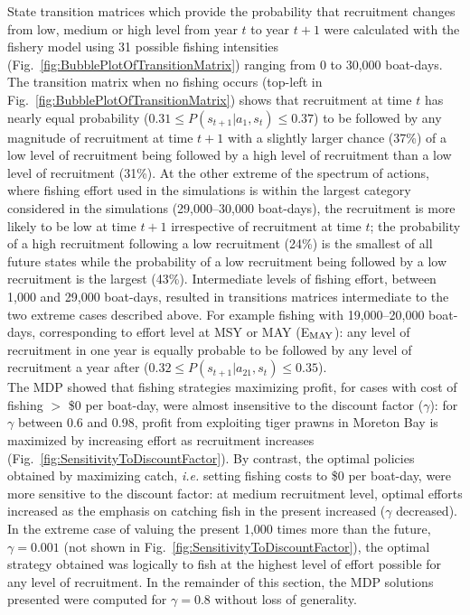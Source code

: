 State transition matrices which provide the probability that recruitment changes from low, medium or high level from year $t$ to year $t+1$ were calculated with the fishery model using 31 possible fishing intensities (Fig.~\ref{fig:BubblePlotOfTransitionMatrix}) ranging from 0 to 30,000 boat-days. The transition matrix when no fishing occurs (top-left in Fig.~\ref{fig:BubblePlotOfTransitionMatrix}) shows that recruitment at time $t$ has nearly equal probability ($0.31 \leq P(s_{t+1}|a_{1}, s_{t}) \leq 0.37$) to be followed by any magnitude of recruitment at time $t+1$ with a slightly larger chance (37\%) of a low level of recruitment being followed by a high level of recruitment than a low level of recruitment (31\%). At the other extreme of the spectrum of actions, where fishing effort used in the simulations is within the largest category considered in the simulations (29,000--30,000 boat-days), the recruitment is more likely to be low at time $t+1$ irrespective of recruitment at time $t$; the probability of a high recruitment following a low recruitment (24\%) is the smallest of all future states while the probability of a low recruitment being followed by a low recruitment is the largest (43\%). Intermediate levels of fishing effort, between 1,000 and 29,000 boat-days, resulted in transitions matrices intermediate to the two extreme cases described above. For example fishing with 19,000--20,000 boat-days, corresponding to effort level at MSY or MAY (E$_{\rm MAY}$): any level of recruitment in one year is equally probable to be followed by any level of recruitment a year after ($0.32 \leq P(s_{t+1}|a_{21}, s_{t}) \leq 0.35$). \\ %

The MDP showed that fishing strategies maximizing profit, for cases with cost of fishing $>$ \$0 per boat-day, were almost insensitive to the discount factor ($\gamma$): for $\gamma$ between 0.6 and 0.98, profit from exploiting tiger prawns in Moreton Bay is maximized by increasing effort as recruitment increases (Fig.~\ref{fig:SensitivityToDiscountFactor}). 
By contrast, the optimal policies obtained by maximizing catch, {\it i.e.} setting fishing costs to \$0 per boat-day, were more sensitive to the discount factor: at medium recruitment level, optimal efforts increased as the emphasis on catching fish in the present increased ($\gamma$ decreased). In the extreme case of valuing the present 1,000 times more than the future, $\gamma = 0.001$ (not shown in Fig.~\ref{fig:SensitivityToDiscountFactor}), the optimal strategy obtained was logically to fish at the highest level of effort possible for any level of recruitment. In the remainder of this section, the MDP solutions presented were computed for $\gamma = 0.8$ without loss of generality.\\


